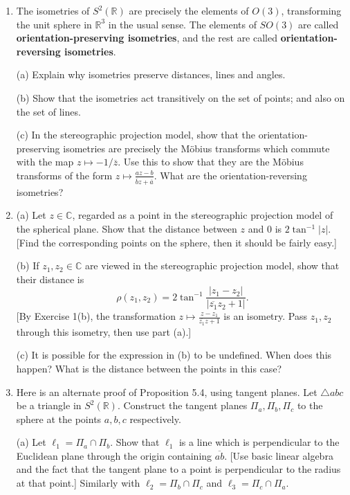 \documentclass[leqno]{book}
\begin{document}
\begin{enumerate}
\item The isometries of $S^2(\mathbb R)$ are precisely the elements of $O(3)$, transforming the unit sphere in $\mathbb R^3$ in the usual sense.  The elements of $SO(3)$ are called \textbf{orientation-preserving isometries}, and the rest are called \textbf{orientation-reversing isometries}.

(a) Explain why isometries preserve distances, lines and angles.

(b) Show that the isometries act transitively on the set of points; and also on the set of lines.

(c) In the stereographic projection model, show that the orientation-preserving isometries are precisely the M\"obius transforms which commute with the map $z\mapsto -1/\overline z$.  Use this to show that they are the M\"obius transforms of the form $z\mapsto\frac{az-b}{\overline bz+\overline a}$.  What are the orientation-reversing isometries?

\item (a) Let $z\in\mathbb C$, regarded as a point in the stereographic projection model of the spherical plane.  Show that the distance between $z$ and $0$ is $2\tan^{-1}|z|$.  [Find the corresponding points on the sphere, then it should be fairly easy.]

(b) If $z_1,z_2\in\mathbb C$ are viewed in the stereographic projection model, show that their distance is
$$\rho(z_1,z_2)=2\tan^{-1}\frac{|z_1-z_2|}{|\overline{z_1}z_2+1|}.$$
[By Exercise 1(b), the transformation $z\mapsto\frac{z-z_1}{\overline{z_1}z+1}$ is an isometry.  Pass $z_1,z_2$ through this isometry, then use part (a).]

(c) It is possible for the expression in (b) to be undefined.  When does this happen?  What is the distance between the points in this case? %

\item Here is an alternate proof of Proposition 5.4, using tangent planes.  Let $\triangle abc$ be a triangle in $S^2(\mathbb R)$.  Construct the tangent planes $\Pi_a,\Pi_b,\Pi_c$ to the sphere at the points $a,b,c$ respectively.

(a) Let $\ell_1=\Pi_a\cap\Pi_b$.  Show that $\ell_1$ is a line which is perpendicular to the Euclidean plane through the origin containing $\overline{ab}$.  [Use basic linear algebra and the fact that the tangent plane to a point is perpendicular to the radius at that point.]  Similarly with $\ell_2=\Pi_b\cap\Pi_c$ and $\ell_3=\Pi_c\cap\Pi_a$.


\end{enumerate}
\end{document}

